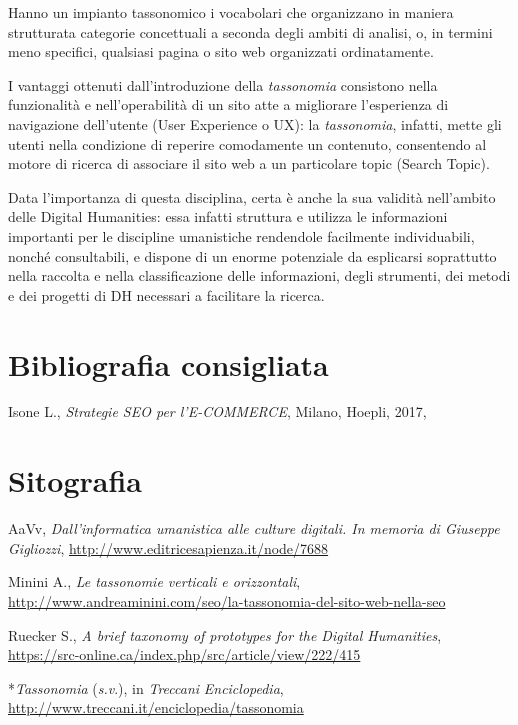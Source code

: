 \documentclass[
  b5paper,
  twoside,
  12pt,
  chapterprefix=false,
  bibliography=totocnumbered,
  parskip=false]{scrbook}
\begin{document}
Hanno un impianto tassonomico i vocabolari che organizzano in maniera
strutturata categorie concettuali a seconda degli ambiti di analisi, o,
in termini meno specifici, qualsiasi pagina o sito web organizzati
ordinatamente.

I vantaggi ottenuti dall'introduzione della \emph{tassonomia} consistono
nella funzionalità e nell'operabilità di un sito atte a migliorare
l'esperienza di navigazione dell'utente (User Experience o UX): la
\emph{tassonomia}, infatti, mette gli utenti nella condizione di reperire
comodamente un contenuto, consentendo al motore di ricerca di associare
il sito web a un particolare topic (Search Topic).

Data l'importanza di questa disciplina, certa è anche la sua validità
nell'ambito delle Digital Humanities: essa infatti struttura e utilizza
le informazioni importanti per le discipline umanistiche rendendole
facilmente individuabili, nonché consultabili, e dispone di un enorme
potenziale da esplicarsi soprattutto nella raccolta e nella
classificazione delle informazioni, degli strumenti, dei metodi e dei
progetti di DH necessari a facilitare la ricerca.

\hypertarget{bibliografia-consigliata-24}{%
\section*{Bibliografia consigliata}\label{bibliografia-consigliata-24}}

Isone L., \emph{Strategie SEO per l'E-COMMERCE}, Milano, Hoepli, 2017,

\hypertarget{sitografia-30}{%
\section*{Sitografia}\label{sitografia-30}}

AaVv, \emph{Dall'informatica umanistica alle culture digitali. In memoria di
Giuseppe Gigliozzi},
\url{http://www.editricesapienza.it/node/7688}

Minini A., \emph{Le tassonomie verticali e orizzontali},
\url{http://www.andreaminini.com/seo/la-tassonomia-del-sito-web-nella-seo}

Ruecker S., \emph{A brief taxonomy of prototypes for the Digital Humanities},
\url{https://src-online.ca/index.php/src/article/view/222/415}

*\emph{Tassonomia} (\emph{s.v}.), in \emph{Treccani} \emph{Enciclopedia},
\url{http://www.treccani.it/enciclopedia/tassonomia}
\end{document}
